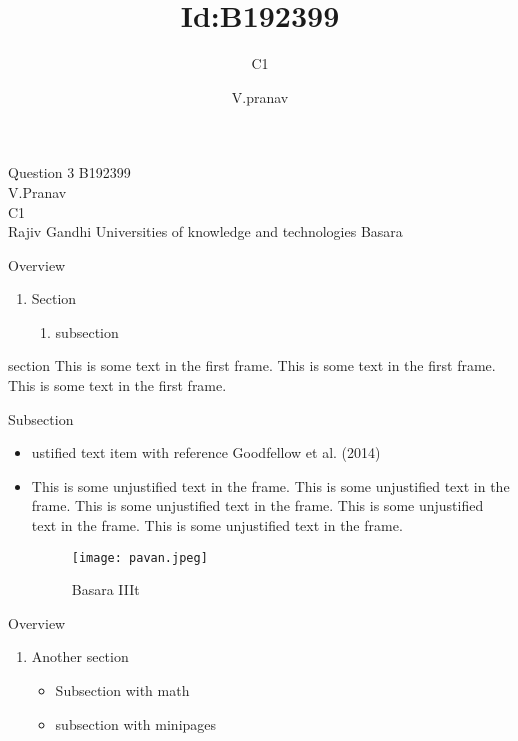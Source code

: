 \documentclass{beamer}
\title{Id:B192399}
\subtitle{C1}
\author{V.pranav}
\date{}
\begin{document}
\begin{frame}{Question 3}
  B192399\\
  V.Pranav\\
  C1\\
 Rajiv Gandhi Universities of knowledge and technologies Basara
\end{frame}

\begin{frame}{Overview}
 \begin{enumerate}
     \item Section
     \begin{enumerate}
         \item subsection
     \end{enumerate}
 \end{enumerate}
\end{frame}

\begin{frame}{section}
This is some text in the first frame. This is some text in the first frame. This is some
text in the first frame.
\end{frame}

\begin{frame}{Subsection}
\begin{itemize}
    \item ustified text item with reference Goodfellow et al. (2014)
    \item This is some unjustified text in the frame. This is some unjustified text in the
frame. This is some unjustified text in the frame. This is some unjustified text in
the frame. This is some unjustified text in the frame.
\begin{figure}
    \centering
    \texttt{[image: pavan.jpeg]}
    \caption{Basara IIIt}
    \label{fig:my_label}
\end{figure}
\end{itemize}
\end{frame}

\begin{frame}{Overview}
    \begin{enumerate}
        \item Another section
        \begin{itemize}
            \item Subsection with math
            \item subsection with minipages
        \end{itemize}
    \end{enumerate}
\end{frame}
\end{document}
